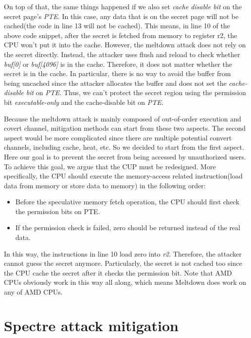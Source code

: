   On top of that, the same things happened if we also set \emph{cache disable bit} 
  on the secret page's \emph{PTE}.  In this case, any data 
  that is on the secret page will not be cached(the code in line 
  13 will not be cached).  This means,  in line 10 of the above code snippet, 
  after the secret is fetched from memory to register r2, the CPU won't 
  put it into the cache.  However, the meltdown attack does not rely on the 
  secret directly.  Instead, the attacker uses flush and reload to check 
  whether \emph{buf[0]} or \emph{buf[4096]} is in the cache. Therefore, it does not 
  matter whether the secret is in the cache.  In particular, there is no 
  way to avoid the buffer from being uncached since the attacker allocates 
  the buffer and does not set the \emph{cache-disable bit} on \emph{PTE}. Thus, we can't
   protect the secret region using the permission bit \emph{executable-only}
   and the cache-disable bit on \emph{PTE}.
  


   

  Because the meltdown attack is mainly composed of out-of-order 
  execution and covert channel, mitigation methods can start from 
  these two aspects. The second aspect would be more complicated 
  since there are multiple potential convert channels, including 
  cache, heat, etc.  So we decided to start from the first aspect. 
  Here our goal is to prevent the secret from being accessed by 
  unauthorized users. To achieve this goal, we argue that the CUP 
  must be redesigned.  More specifically, the CPU should execute 
  the memory-access related instruction(load data from memory or 
  store data to memory) in the following order\cite{3}:
  \begin{itemize}
    \item Before the speculative memory fetch operation, the CPU should first check the permission bits on PTE. 
    \item If the permission check is failed, zero should be returned instead of the real data.
  \end{itemize}
  In this way, the instructions in line 10 load zero into \emph{r2}. 
  Therefore, the attacker cannot guess the secret anymore. Particularly, the secret is not cached too since the CPU cache the secret after 
  it checks the permission bit. Note that AMD CPUs obviously work in
  this way all along, which means Meltdown does work on any of AMD CPUs\cite{26}.


\section{Spectre attack mitigation}

